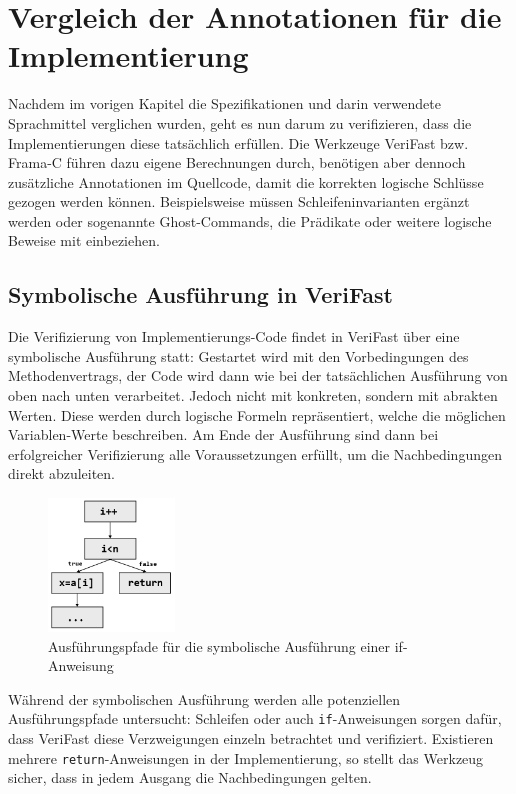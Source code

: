 ﻿\chapter{Vergleich der Annotationen für die Implementierung}

Nachdem im vorigen Kapitel die Spezifikationen und darin verwendete Sprachmittel verglichen wurden,
geht es nun darum zu verifizieren, dass die Implementierungen diese tatsächlich erfüllen.
Die Werkzeuge VeriFast bzw. Frama-C führen dazu eigene Berechnungen durch, benötigen aber dennoch
zusätzliche Annotationen im Quellcode, damit die korrekten logische Schlüsse gezogen 
werden können. Beispielsweise müssen Schleifeninvarianten ergänzt werden oder sogenannte
Ghost-Commands, die Prädikate oder weitere logische Beweise mit einbeziehen.


\section{Symbolische Ausführung in VeriFast}

Die Verifizierung von Implementierungs-Code findet in VeriFast über eine symbolische Ausführung statt:
Gestartet wird mit den Vorbedingungen des Methodenvertrags, der Code wird dann wie bei der tatsächlichen
Ausführung von oben nach unten verarbeitet. Jedoch nicht mit konkreten, sondern mit 
abrakten Werten. Diese werden durch logische Formeln repräsentiert, welche die möglichen Variablen-Werte 
beschreiben. Am Ende der Ausführung sind dann bei erfolgreicher Verifizierung alle Voraussetzungen
erfüllt, um die Nachbedingungen direkt abzuleiten.

\begin{figure}
	\centering
		\includegraphics[width=0.3\textwidth]{images/symbolic_execution.png}
		\caption{Ausführungspfade für die symbolische Ausführung einer if-Anweisung}
\end{figure}

Während der symbolischen Ausführung werden alle potenziellen Ausführungspfade untersucht: Schleifen
oder auch \texttt{if}-Anweisungen sorgen dafür, dass VeriFast diese Verzweigungen einzeln betrachtet
und verifiziert. Existieren mehrere \texttt{return}-Anweisungen in der Implementierung, so stellt
das Werkzeug sicher, dass in jedem Ausgang die Nachbedingungen gelten.

